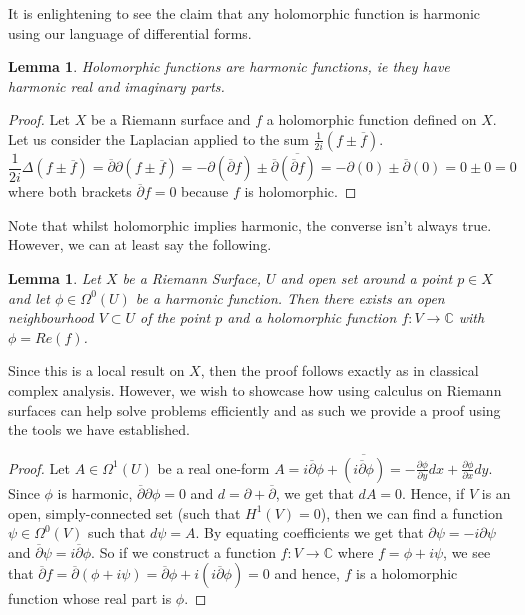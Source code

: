 \documentclass[11pt]{report}
\newtheorem{lemma}[thm]{Lemma}
\theoremstyle{definition}
\begin{document}
It is enlightening to see the claim that any holomorphic function is harmonic using our language of differential forms.
\begin{lemma}\label{HolIsHarm}
  Holomorphic functions are harmonic functions, ie they have harmonic real and imaginary parts. 
\end{lemma} 
\begin{proof}
  Let $X$ be a Riemann surface and $f$ a holomorphic function defined on $X$.
  Let us consider the Laplacian applied to the sum $\frac{1}{2i}(f \pm \overline{f})$.
  \[\frac{1}{2i}\Delta(f \pm \overline{f}) = \overline{\partial}\partial(f \pm \overline{f})=-\partial(\overline{\partial}f) \pm \overline{\partial}\overline{(\overline{\partial}f)}=-\partial(0) \pm \overline{\partial}(0) = 0 \pm 0 = 0\]
  where both brackets $\overline{\partial} f = 0$ because $f$ is holomorphic.
\end{proof}

Note that whilst holomorphic implies harmonic, the converse isn't always true. However, we can at least say the following.

\begin{lemma}\label{HarmRealHol}
  Let $X$ be a Riemann Surface, $U$ and open set around a point $p \in X$ and let $\phi \in \Omega^0(U)$ be a harmonic function. Then there exists an open neighbourhood $V \subset U$ of the point $p$ and a holomorphic function $f \colon V \rightarrow \mathbb{C}$ with $\phi = Re(f)$.
\end{lemma}
Since this is a local result on $X$, then the proof follows exactly as in classical complex analysis. However, we wish to showcase how using calculus on Riemann surfaces can help solve problems efficiently and as such we provide a proof using the tools we have established.
\begin{proof}
  Let $A \in \Omega^1(U)$ be a real one-form $A = i\overline{\partial}\phi + \overline{(i\overline{\partial}\phi)} = -\frac{\partial \phi}{\partial y} dx + \frac{\partial \phi}{\partial x} dy$. Since $\phi$ is harmonic, $\overline{\partial}\partial \phi = 0$ and $d = \partial + \overline{\partial}$, we get that $dA = 0$. Hence, if $V$ is an open, simply-connected set (such that $H^1(V)=0$), then we can find a function $\psi \in \Omega^0(V)$ such that $d\psi = A$. By equating coefficients we get that $\partial \psi = -i \partial \psi$ and $\overline{\partial} \psi = i \overline{\partial} \phi$. So if we construct a function $f \colon V \rightarrow \mathbb{C}$ where $f = \phi + i \psi$, we see that $\overline{\partial}f = \overline{\partial}(\phi + i\psi) = \overline{\partial}\phi +i(i\overline{\partial}\phi) = 0$ and hence, $f$ is a holomorphic function whose real part is $\phi$. 
\end{proof}
\end{document}
